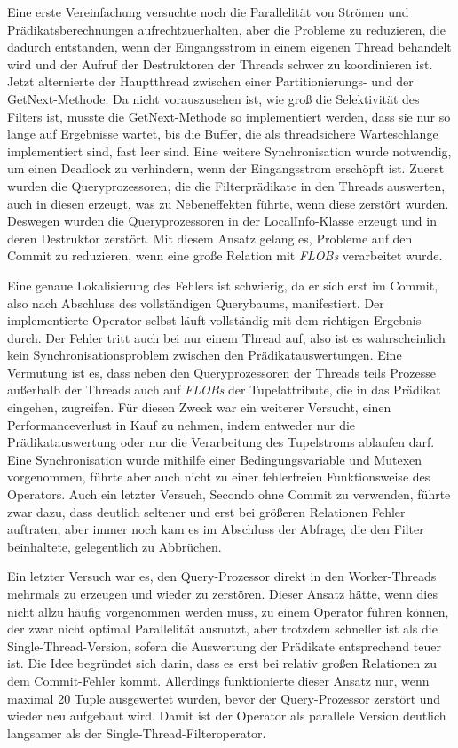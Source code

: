 \documentclass[a4paper,12pt,twoside]{article}
\newcommand{\Fb}[1]{\textit{#1}} %
\begin{document}
{Eine erste Vereinfachung versuchte noch die Parallelität von Strömen und Prädikatsberechnungen aufrechtzuerhalten, aber die Probleme zu reduzieren, die dadurch entstanden, wenn der Eingangsstrom in einem eigenen Thread behandelt wird und der Aufruf der Destruktoren der Threads schwer zu koordinieren ist. Jetzt alternierte der Hauptthread zwischen einer Partitionierungs- und der GetNext-Methode. Da nicht vorauszusehen ist, wie groß die Selektivität des Filters ist, musste die GetNext-Methode so implementiert werden, dass sie nur so lange auf Ergebnisse wartet, bis die Buffer, die als threadsichere Warteschlange implementiert sind, fast leer sind. Eine weitere Synchronisation wurde notwendig, um einen Deadlock zu verhindern, wenn der Eingangsstrom erschöpft ist. Zuerst wurden die Queryprozessoren, die die Filterprädikate in den Threads auswerten, auch in diesen erzeugt, was zu Nebeneffekten führte, wenn diese zerstört wurden. Deswegen wurden die Queryprozessoren in der LocalInfo-Klasse erzeugt und in deren Destruktor zerstört. Mit diesem Ansatz gelang es, Probleme auf den Commit zu reduzieren, wenn eine große Relation mit \Fb{FLOBs} verarbeitet wurde.

Eine genaue Lokalisierung des Fehlers ist schwierig, da er sich erst im Commit, also nach Abschluss des vollständigen Querybaums, manifestiert. Der implementierte Operator selbst läuft vollständig mit dem richtigen Ergebnis durch. Der Fehler tritt auch bei nur einem Thread auf, also ist es wahrscheinlich kein Synchronisationsproblem zwischen den Prädikatauswertungen. Eine Vermutung ist es, dass neben den Queryprozessoren der Threads teils Prozesse außerhalb der Threads auch auf \Fb{FLOBs} der Tupelattribute, die in das Prädikat eingehen, zugreifen. Für diesen Zweck war ein weiterer Versucht, einen Performanceverlust in Kauf zu nehmen, indem entweder nur die Prädikatauswertung oder nur die Verarbeitung des Tupelstroms ablaufen darf. Eine Synchronisation wurde mithilfe einer Bedingungsvariable und Mutexen vorgenommen, führte aber auch nicht zu einer fehlerfreien Funktionsweise des Operators. Auch ein letzter Versuch, Secondo ohne Commit zu verwenden, führte zwar dazu, dass deutlich seltener und erst bei größeren Relationen Fehler auftraten, aber immer noch kam es im Abschluss der Abfrage, die den Filter beinhaltete, gelegentlich zu Abbrüchen.

Ein letzter Versuch war es, den Query-Prozessor direkt in den Worker-Threads mehrmals zu erzeugen und wieder zu zerstören. Dieser Ansatz hätte, wenn dies nicht allzu häufig vorgenommen werden muss, zu einem Operator führen können, der zwar nicht optimal Parallelität ausnutzt, aber trotzdem schneller ist als die Single-Thread-Version, sofern die Auswertung der Prädikate entsprechend teuer ist. Die Idee begründet sich darin, dass es erst bei relativ großen Relationen zu dem Commit-Fehler kommt. Allerdings funktionierte dieser Ansatz nur, wenn maximal 20 Tuple ausgewertet wurden, bevor der Query-Prozessor zerstört und wieder neu aufgebaut wird. Damit ist der Operator als parallele Version deutlich langsamer als der Single-Thread-Filteroperator. 

}
\end{document}
